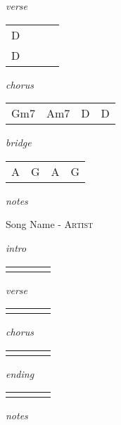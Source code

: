 \documentclass[12pt]{article}
\begin{document}
\textit{verse}

\begin{tabular}{|P{1.25in}|P{1.25in}|P{1.25in}|P{1.25in}|}
  D   &   &   &   \\
  D   &   &   &   \\
\end{tabular}

\textit{chorus}

\begin{tabular}{|P{1.25in}|P{1.25in}|P{1.25in}|P{1.25in}|}
  Gm7 & Am7  & D & D \\
\end{tabular}

\textit{bridge}

\begin{tabular}{|P{1.25in}|P{1.25in}|P{1.25in}|P{1.25in}|}
  A & G  &  A &  G \\
\end{tabular}

\textit{notes}

\newpage



{\Huge Song Name} {\huge - \textsc{Artist}}

\huge
\textit{intro}

\begin{tabular}{|P{1.25in}|P{1.25in}|P{1.25in}|P{1.25in}|}
    &   &   &   \\
\end{tabular}

\textit{verse}

\begin{tabular}{|P{1.25in}|P{1.25in}|P{1.25in}|P{1.25in}|}
    &   &   &   \\
\end{tabular}

\textit{chorus}

\begin{tabular}{|P{1.25in}|P{1.25in}|P{1.25in}|P{1.25in}|}
    &   &   &   \\
\end{tabular}

\textit{ending}

\begin{tabular}{|P{1.25in}|P{1.25in}|P{1.25in}|P{1.25in}|}
    &   &   &   \\
\end{tabular}

\textit{notes}

\newpage
\end{document}
